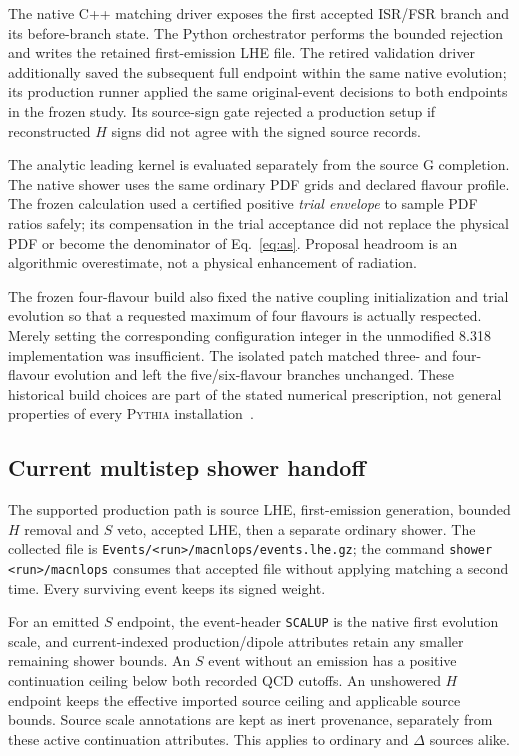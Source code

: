 \documentclass[11pt,a4paper]{article}
\newcommand{\pythia}{\textsc{Pythia}}
\newcommand{\code}[1]{\texttt{\small #1}}
\begin{document}
The native C++ matching driver exposes the first accepted ISR/FSR branch
and its before-branch state. The Python orchestrator performs the bounded
rejection and writes the retained first-emission LHE file. The retired
validation driver additionally saved the subsequent full endpoint within
the same native evolution; its production runner applied the same
original-event decisions to both endpoints in the frozen study. Its
source-sign gate rejected a production setup if reconstructed $H$ signs
did not agree with the signed source records.

The analytic leading kernel is evaluated separately from the source
G completion. The native shower uses the same ordinary PDF grids and
declared flavour profile. The frozen calculation used a certified positive
\emph{trial envelope} to sample PDF ratios safely; its compensation in the
trial acceptance did not replace the physical PDF or become the
denominator of Eq.~\eqref{eq:as}. Proposal headroom is an algorithmic
overestimate, not a physical enhancement of radiation.

The frozen four-flavour build also fixed the native coupling initialization
and trial evolution so that a requested maximum of four flavours is
actually respected. Merely setting the corresponding configuration
integer in the unmodified 8.318 implementation was insufficient.
The isolated patch matched three- and four-flavour evolution and left
the five/six-flavour branches unchanged. These historical build choices are part
of the stated numerical prescription, not general properties of every
\pythia{} installation~\cite{Pythia8}.

\subsection{Current multistep shower handoff}
The supported production path is source LHE, first-emission generation,
bounded $H$ removal and $S$ veto, accepted LHE, then a separate ordinary
shower. The collected file is
\code{Events/<run>/macnlops/events.lhe.gz}; the command
\code{shower <run>/macnlops} consumes that accepted file without applying
matching a second time. Every surviving event keeps its signed weight.

For an emitted $S$ endpoint, the event-header \code{SCALUP} is the native
first evolution scale, and current-indexed production/dipole attributes
retain any smaller remaining shower bounds. An $S$ event without an
emission has a positive continuation ceiling below both recorded QCD
cutoffs. An unshowered $H$ endpoint keeps the effective imported source
ceiling and applicable source bounds. Source scale annotations are kept
as inert provenance, separately from these active continuation attributes.
This applies to ordinary and $\Delta$ sources alike.
\end{document}

